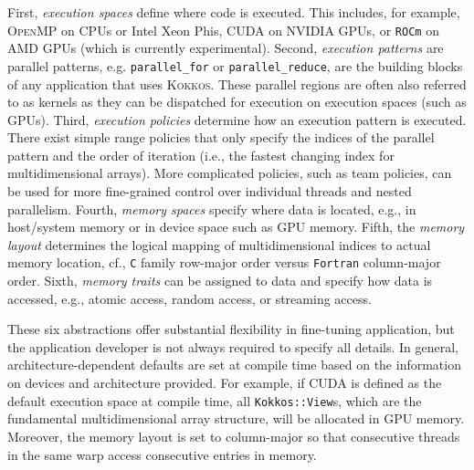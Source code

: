 \documentclass[10pt,journal,compsoc]{IEEEtran}
\newcommand{\textcode}[1]{\textsc{#1}}
\newcommand{\kokkos}{\textcode{Kokkos}\xspace}
\newcommand{\cuda}{\textcode{CUDA}\xspace}
\newcommand{\openmp}{\textcode{OpenMP}\xspace}
\begin{document}
First, \textit{execution spaces} define where code is executed. This includes, for example,
\openmp on CPUs or Intel Xeon Phis, \cuda on NVIDIA GPUs, or \texttt{ROCm} on AMD GPUs 
(which is currently experimental).
Second, \textit{execution patterns} are parallel patterns, e.g. \texttt{parallel\_for} or 
\texttt{parallel\_reduce}, are the building blocks of any application that uses
\kokkos.
These parallel regions are often also referred to as kernels as they can be dispatched for 
execution on execution spaces (such as GPUs).
Third, \textit{execution policies} determine how an execution pattern is executed.
There exist simple range policies that only specify the indices of
the parallel pattern and the order of iteration (i.e., the fastest changing index for
multidimensional arrays).
More complicated policies, such as team policies, can be used for more fine-grained
control over individual threads and nested parallelism.
Fourth, \textit{memory spaces} specify where data is located, e.g., in host/system
memory or in device space such as GPU memory.
Fifth, the \textit{memory layout} determines the logical mapping of multidimensional
indices to actual memory location, cf., \texttt{C} family row-major order versus
\texttt{Fortran} column-major order.
Sixth, \textit{memory traits} can be assigned to data and specify how data is accessed, e.g.,
atomic access, random access, or streaming access.

These six abstractions offer substantial flexibility in fine-tuning
application, but the application developer is not always required to specify all details.
In general, architecture-dependent defaults are set at compile time based on the 
information on devices and architecture provided.
For example, if \cuda is defined as the default execution space at compile time, all
\texttt{Kokkos::View}s, which are the fundamental multidimensional array structure,
will be allocated in GPU memory.
Moreover, the memory layout is set to column-major so that consecutive threads in the 
same warp access consecutive entries in memory.
\end{document}
